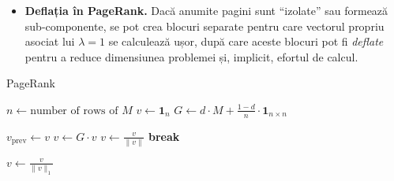 \documentclass{exam}
\begin{document}
\begin{itemize}
	\item \textbf{Deflația în PageRank.} Dacă anumite pagini sunt “izolate” sau
	      formează sub-componente, se pot crea blocuri separate pentru care vectorul
	      propriu asociat lui $\lambda=1$ se calculează ușor, după care aceste blocuri
	      pot fi \textit{deflate} pentru a reduce dimensiunea problemei și, implicit,
	      efortul de calcul.
\end{itemize}

\begin{algorithm}
	\caption{PageRank}
	\begin{algorithmic}[1]
		\State \( n \gets \text{number of rows of } M \)
		\State \( v \gets \textbf{1}_n \)
		\State \( G \gets d \cdot M + \frac{1 - d}{n} \cdot \textbf{1}_{n \times n} \)

		\State \( v_{\text{prev}} \gets v \)
		\State \( v \gets G \cdot v \)
		\State \( v \gets \frac{v}{\| v \|} \)
		\State \textbf{break}
		\EndIf
		\EndWhile

		\State \( v \gets \frac{v}{\| v \|_1} \)
	\end{algorithmic}
\end{algorithm}





\end{document}
